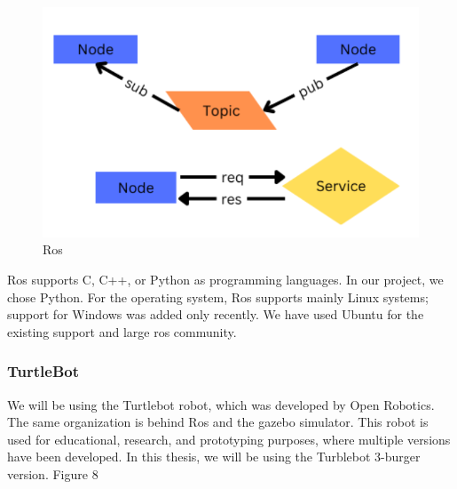 \documentclass[12pt]{extarticle}
\begin{document}
 
 \begin{figure}[H]  
\centering
\includegraphics[scale=0.4]{ros}
\caption[Ros]{Ros}
\end{figure}




Ros supports C, C++, or Python as programming languages. In our project, we chose Python. For the operating system, Ros supports mainly Linux systems; support for Windows was added only recently. We have used Ubuntu for the existing support and large ros community.







\subsubsection{TurtleBot}
We will be using the Turtlebot robot, which was developed by Open Robotics. The same organization is behind Ros and the gazebo simulator.
This robot is used for educational, research, and prototyping purposes, where multiple versions have been developed. In this thesis, we will be using the Turblebot 3-burger version. Figure 8\cite{turtlebot}
\end{document}
